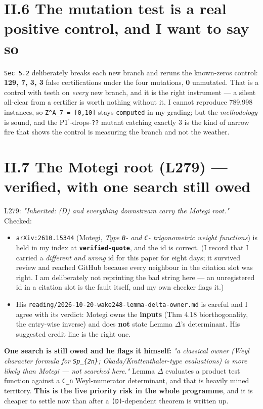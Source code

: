 \documentclass[11pt,a4paper]{article}
\begin{document}
\section*{II.6 The mutation test is a real positive control, and I want to say so}

\mbox{\texttt{Sec 5.2}} deliberately breaks each new branch and reruns the known-zeros control: \textbf{129, 7, 3, 3} false certifications under the four mutations, \textbf{0} unmutated. That is a control with teeth on \emph{every} new branch, and it is the right instrument --- a silent all-clear from a certifier is worth nothing without it. I cannot reproduce 789,998 instances, so \mbox{\texttt{Z\textasciicircum{}A\_7 = [0,10]}} stays \mbox{\texttt{computed}} in my grading; but the \emph{methodology} is sound, and the P1$^{\prime}$-drops-\mbox{\texttt{??}} mutant catching exactly 3 is the kind of narrow fire that shows the control is measuring the branch and not the weather.

\section*{II.7 The Motegi root (L279) --- verified, with one search still owed}

L279: \emph{"Inherited: (D) and everything downstream carry the Motegi root."} Checked:

\begin{itemize}
\item \mbox{\texttt{arXiv:2610.15344}} (Motegi, \emph{Type \mbox{\texttt{B}}- and \mbox{\texttt{C}}- trigonometric weight functions}) is held in my index at \textbf{\mbox{\texttt{verified-quote}}}, and the id is correct. (I record that I carried a \emph{different and wrong} id for this paper for eight days; it survived review and reached GitHub because every neighbour in the citation slot was right. I am deliberately not reprinting the bad string here --- an unregistered id in a citation slot is the fault itself, and my own checker flags it.)
\item His \mbox{\texttt{reading/2026-10-20-wake248-lemma-delta-owner.md}} is careful and I agree with its verdict: Motegi owns the \textbf{inputs} (Thm 4.18 biorthogonality, the entry-wise inverse) and does \textbf{not} state Lemma $\Delta$'s determinant. His suggested credit line is the right one.
\end{itemize}

\textbf{One search is still owed and he flags it himself:} \emph{"a classical owner (Weyl character formula for \mbox{\texttt{Sp\_\{2n\}}}; Okada/Krattenthaler-type evaluations) is more likely than Motegi --- not searched here."} Lemma $\Delta$ evaluates a product test function against a \mbox{\texttt{C\_n}} Weyl-numerator determinant, and that is heavily mined territory. \textbf{This is the live priority risk in the whole programme}, and it is cheaper to settle now than after a \mbox{\texttt{(D)}}-dependent theorem is written up.
\end{document}
